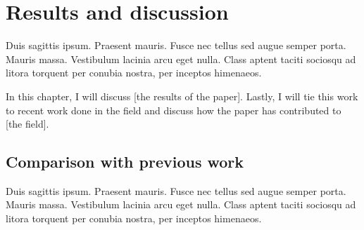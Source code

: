 
\chapter{Results and discussion}
\label{chap: results}
Duis sagittis ipsum. Praesent mauris. Fusce nec tellus sed augue semper porta. Mauris massa. Vestibulum lacinia arcu eget nulla. Class aptent taciti sociosqu ad litora torquent per conubia nostra, per inceptos himenaeos.

In this chapter, I will discuss [the results of the paper]. Lastly, I will tie this work to recent work done in the field and discuss how the \citet{myPaper} paper has contributed to [the field].

\section{Comparison with previous work}
Duis sagittis ipsum. Praesent mauris. Fusce nec tellus sed augue semper porta. Mauris massa. Vestibulum lacinia arcu eget nulla. Class aptent taciti sociosqu ad litora torquent per conubia nostra, per inceptos himenaeos.






